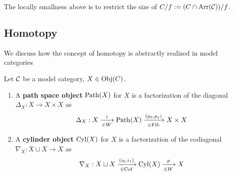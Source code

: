         \begin{note}
            The locally smallness above is to restrict the size of $C/f := (C \cap \operatorname{\rm{Arr}}(\mathcal{C}))/f$.
        \end{note}


    \subsection{Homotopy}

        We discuss how the concept of homotopy is abstractly realized in model categories

        \begin{defn}
            Let $\mathcal{C}$ be a model category, $X \in \operatorname{\rm{Obj}}(C)$.\\
            \begin{enumerate}
                \item A \textbf{path space object} $\operatorname{Path}(X)$ for $X$ is a factorization of the diagonal $\Delta_X : X \to X \times X$ as
                    $$ \Delta_X : X \xrightarrow[\in W]{i} \operatorname{Path}(X) \xrightarrow[\in \mathrm{Fib}]{(p_0,p_1)} X \times X $$
                \item A \textbf{cylinder object} $\operatorname{Cyl}(X)$ for $X$ is a factorization of the codiagonal $\nabla_X : X \sqcup X \to X$ as
                    $$ \nabla_X : X \sqcup  X \xrightarrow[\in \mathrm{Cof}]{(i_0, i_1)} \operatorname{Cyl}(X) \xrightarrow[\in W]{p} X $$
            \end{enumerate}
        \end{defn}



    
    
